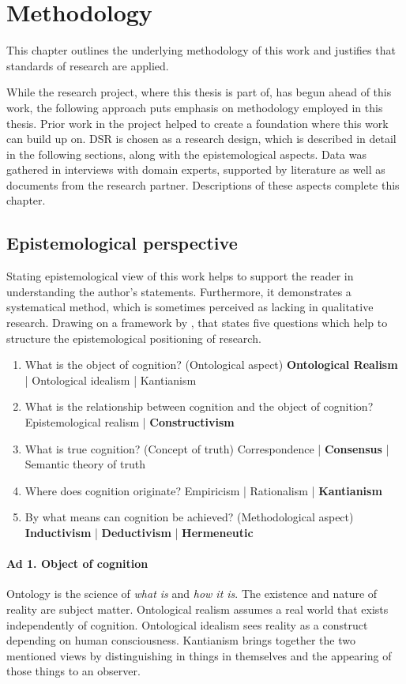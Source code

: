 \chapter{Methodology}
This chapter outlines the underlying methodology of this work and justifies that standards of research are applied. 

While the research project, where this thesis is part of, has begun ahead of this work, the following approach puts emphasis on methodology employed in this thesis. Prior work in the project helped to create a foundation where this work can build up on. \acrfull{DSR} is chosen as a research design, which is described in detail in the following sections, along with the epistemological aspects. Data was gathered in interviews with domain experts, supported by literature as well as documents from the research partner. Descriptions of these aspects complete this chapter. 


	\section{Epistemological perspective}
Stating epistemological view of this work helps to support the reader in understanding the author's statements. Furthermore, it demonstrates a systematical method, which is sometimes perceived as lacking in qualitative research. Drawing on a framework by \cite{becker2007epistemological}, that states five questions which help to structure the epistemological positioning of research.

\begin{enumerate}
	\item What is the object of cognition? (Ontological aspect)
		\subitem \textbf{Ontological Realism} | Ontological idealism  | Kantianism
	\item What is the relationship between cognition and the object of cognition?
		\subitem Epistemological realism | \textbf{Constructivism}
	\item What is true cognition? (Concept of truth)
		\subitem Correspondence |  \textbf{Consensus} |  Semantic theory of truth
	\item Where does cognition originate?
	\subitem Empiricism | Rationalism | \textbf{Kantianism}
	\item By what means can cognition be achieved? (Methodological aspect)
		\subitem \textbf{Inductivism} | \textbf{Deductivism} | \textbf{Hermeneutic}
\end{enumerate}
\subsubsection{Ad 1. Object of cognition}
Ontology is the science of \textit{what is} and \textit{how it is}. The existence and nature of reality are subject matter. Ontological realism assumes a real world that exists independently of cognition. Ontological idealism sees reality as a construct depending on human consciousness. Kantianism brings together the two mentioned views by distinguishing in things in themselves and the appearing of those things to an observer. 

